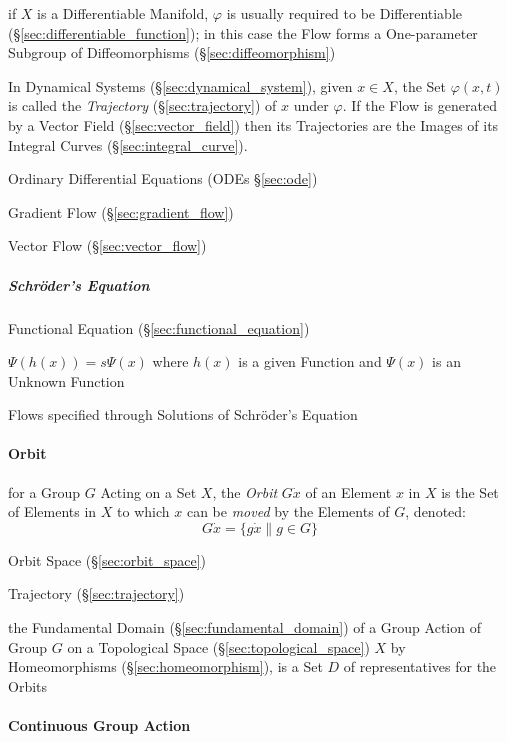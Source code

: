 if $X$ is a Differentiable Manifold, $\varphi$ is usually required to be
Differentiable (\S\ref{sec:differentiable_function}); in this case the Flow
forms a One-parameter Subgroup of Diffeomorphisms (\S\ref{sec:diffeomorphism})

In Dynamical Systems (\S\ref{sec:dynamical_system}), given $x \in X$, the Set
$\varphi(x,t)$ is called the \emph{Trajectory} (\S\ref{sec:trajectory}) of $x$
under $\varphi$. If the Flow is generated by a Vector Field
(\S\ref{sec:vector_field}) then its Trajectories are the Images of its Integral
Curves (\S\ref{sec:integral_curve}).

\fist Ordinary Differential Equations (ODEs \S\ref{sec:ode})

\fist Gradient Flow (\S\ref{sec:gradient_flow})

\fist Vector Flow (\S\ref{sec:vector_flow})



\subparagraph{Schr\"oder's Equation}\label{sec:schroders_equation}\hfill

Functional Equation (\S\ref{sec:functional_equation})

$\Psi(h(x)) = s\Psi(x)$ where $h(x)$ is a given Function and $\Psi(x)$ is
an Unknown Function

Flows specified through Solutions of Schr\"oder's Equation




\paragraph{Orbit}\label{sec:orbit}\hfill

for a Group $G$ Acting on a Set $X$, the \emph{Orbit} $G \dot x$ of an Element
$x$ in $X$ is the Set of Elements in $X$ to which $x$ can be \emph{moved} by
the Elements of $G$, denoted:
\[
  G \dot x = \{ g \dot x \| g \in G \}
\]

\fist Orbit Space (\S\ref{sec:orbit_space})

\fist Trajectory (\S\ref{sec:trajectory})

the Fundamental Domain (\S\ref{sec:fundamental_domain}) of a Group Action of
Group $G$ on a Topological Space (\S\ref{sec:topological_space}) $X$ by
Homeomorphisms (\S\ref{sec:homeomorphism}), is a Set $D$ of representatives for
the Orbits



\paragraph{Continuous Group Action}\label{sec:continuous_group_action}

